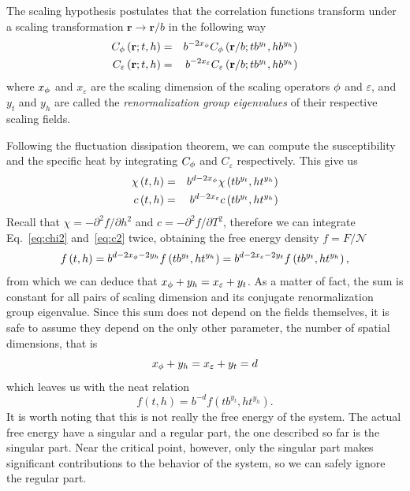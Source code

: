 The scaling hypothesis postulates that the correlation functions transform
under a scaling transformation $\mathbf{r}\rightarrow\mathbf{r}/b$ in the
following way
\begin{eqnarray}
    \label{eq:scal}
    C_{\phi}\left(\mathbf{r};t,h\right) & = &
    b^{-2x_{\phi}}C_{\phi}\left(\mathbf{r}/b;tb^{y_{t}},hb^{y_{h}}\right)\\
    \label{eq:scal10}
    C_{\varepsilon}\left(\mathbf{r};t,h\right) & = &
    b^{-2x_{\varepsilon}}C_{\varepsilon}\left(\mathbf{r}/b;tb^{y_{t}},hb^{y_{h}}\right)
\end{eqnarray}
where $x_\phi$ and $x_\varepsilon$ are the scaling dimension of the scaling
operators $\phi$ and $\varepsilon$, and $y_t$ and $y_h$ are called the
\textit{renormalization group eigenvalues} of their respective scaling fields.

Following the fluctuation dissipation theorem, we can compute the susceptibility
and the specific heat by integrating $C_\phi$ and $C_\varepsilon$ respectively.
This give us
\begin{eqnarray}
    \label{eq:chi2}
    \chi\left(t,h\right) & = & b^{d-2x_{\phi}}\chi\left(tb^{y_{t}},ht^{y_{h}}\right)\\
    \label{eq:c2}
    c\left(t,h\right) & = & b^{d-2x_{\varepsilon}}c\left(tb^{y_{t}},ht^{y_{h}}\right)
\end{eqnarray}
Recall that $\chi=-\partial^2 f/\partial h^2$ and $c=-\partial^2 f/\partial
T^2$, therefore we can integrate Eq.~\ref{eq:chi2} and~\ref{eq:c2} twice,
obtaining the free energy density $f=F/\mathcal{N}$
\begin{equation}
    f\left(t,h\right)=
    b^{d-2x_{\phi}-2y_{h}}f\left(tb^{y_{t}},ht^{y_{h}}\right)=
    b^{d-2x_{\varepsilon}-2y_{t}}f\left(tb^{y_{t}},ht^{y_{h}}\right),
\end{equation}
from which we can deduce that $x_\phi+y_h = x_\varepsilon+y_t$. As a matter of
fact, the sum is constant for all pairs of scaling dimension and its conjugate
renormalization group eigenvalue. Since this sum does not depend on the fields
themselves, it is safe to assume they depend on the only other parameter, the
number of spatial dimensions, that is
\begin{equation}
    \label{eq:scald}
    x_\phi+y_h = x_\varepsilon+y_t = d
\end{equation}
which leaves us with the neat relation
\begin{equation}
    f\left(t,h\right)=b^{-d}f\left(tb^{y_{t}},ht^{y_{h}}\right).
\end{equation}
It is worth noting that this is not really the free energy of the system. The
actual free energy have a singular and a regular part, the one described so
far is the singular part. Near the critical point, however, only the singular
part makes significant contributions to the behavior of the system, so we can
safely ignore the regular part.

